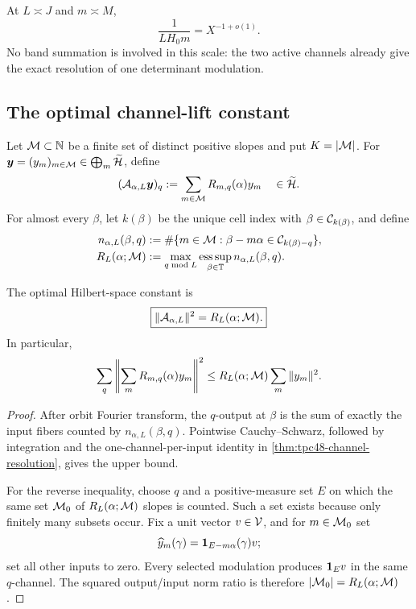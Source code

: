 At \(L\asymp J\) and \(m\asymp M\),
\begin{equation}
 \frac1{LH_0m}=X^{-1+o(1)}.
 \label{eq:tpc48-critical-tube-scale}
\end{equation}
No band summation is involved in this scale: the two active channels
already give the exact resolution of one determinant modulation.

\subsection{The optimal channel-lift constant}

Let \(\mathcal M\subset\mathbb N\) be a finite set of distinct positive slopes and put
\(K=|\mathcal M|\).  For
\(\bm y=(y_m)_{m\in\mathcal M}\in\bigoplus_m\widetilde{\mathcal H}\), define
\begin{equation}
 (\mathcal A_{\alpha,L}\bm y)_q
 :=\sum_{m\in\mathcal M}R_{m,q}(\alpha)y_m
 \quad\in\widetilde{\mathcal H}.
 \label{eq:tpc48-channel-lift}
\end{equation}
For almost every \(\beta\), let \(k(\beta)\) be the unique cell index
with \(\beta\in\mathcal C_{k(\beta)}\), and define
\begin{align}
 n_{\alpha,L}(\beta,q)
 &:=\#\{m\in\mathcal M:
       \beta-m\alpha\in\mathcal C_{k(\beta)-q}\},
 \label{eq:tpc48-pointwise-load}\\
 R_L(\alpha;\mathcal M)
 &:=\max_{q\bmod L}\operatorname*{ess\,sup}_{\beta\in\mathbb T}
 n_{\alpha,L}(\beta,q).
 \label{eq:tpc48-max-load}
\end{align}

\begin{theorem}
\label{thm:tpc48-channel-norm}
The optimal Hilbert-space constant is
\begin{equation}
 \boxed{\|\mathcal A_{\alpha,L}\|^2=R_L(\alpha;\mathcal M).}
 \label{eq:tpc48-channel-norm}
\end{equation}
In particular,
\begin{equation}
 \sum_q\left\|
 \sum_mR_{m,q}(\alpha)y_m
 \right\|^2
 \le R_L(\alpha;\mathcal M)\sum_m\|y_m\|^2.
 \label{eq:tpc48-channel-square-function}
\end{equation}
\end{theorem}

\begin{proof}
After orbit Fourier transform, the \(q\)-output at \(\beta\) is the
sum of exactly the input fibers counted by
\(n_{\alpha,L}(\beta,q)\).  Pointwise Cauchy--Schwarz, followed by
integration and the one-channel-per-input identity in
\cref{thm:tpc48-channel-resolution}, gives the upper bound.

For the reverse inequality, choose \(q\) and a positive-measure set
\(E\) on which the same set \(\mathcal M_0\) of
\(R_L(\alpha;\mathcal M)\) slopes is counted.  Such a set exists because only
finitely many subsets occur.  Fix a unit vector \(v\in\mathcal V\), and for
\(m\in\mathcal M_0\) set
\[
 \widehat y_m(\gamma)=\mathbf 1_{E-m\alpha}(\gamma)v;
\]
set all other inputs to zero.  Every selected modulation produces
\(\mathbf 1_Ev\) in the same \(q\)-channel.  The squared output/input norm
ratio is therefore \(|\mathcal M_0|=R_L(\alpha;\mathcal M)\).
\end{proof}


